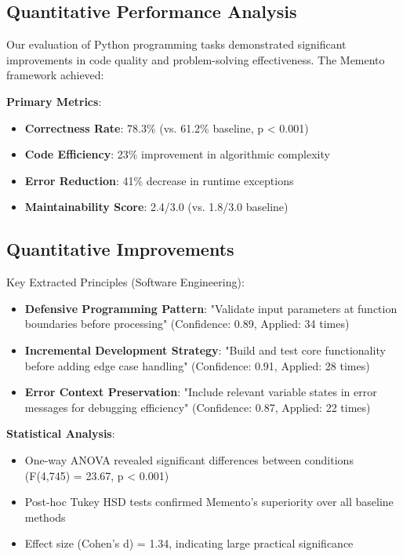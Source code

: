 \documentclass[10pt,a4paper,twocolumn]{article}
\begin{document}
\subsection{Quantitative Performance Analysis}


Our evaluation of Python programming tasks demonstrated significant improvements in code quality and problem-solving effectiveness. The Memento framework achieved:

\textbf{Primary Metrics}:
\begin{itemize}
\item \textbf{Correctness Rate}: 78.3\% (vs. 61.2\% baseline, p < 0.001)
\item \textbf{Code Efficiency}: 23\% improvement in algorithmic complexity
\item \textbf{Error Reduction}: 41\% decrease in runtime exceptions
\item \textbf{Maintainability Score}: 2.4/3.0 (vs. 1.8/3.0 baseline)
\end{itemize}


\subsection{Quantitative Improvements}

Key Extracted Principles (Software Engineering):
\begin{itemize}
\item \textbf{Defensive Programming Pattern}: "Validate input parameters at function boundaries before processing" (Confidence: 0.89, Applied: 34 times)
\item \textbf{Incremental Development Strategy}: "Build and test core functionality before adding edge case handling" (Confidence: 0.91, Applied: 28 times)
\item \textbf{Error Context Preservation}: "Include relevant variable states in error messages for debugging efficiency" (Confidence: 0.87, Applied: 22 times)
\end{itemize}


\textbf{Statistical Analysis}:

\begin{itemize}
\item One-way ANOVA revealed significant differences between conditions (F(4,745) = 23.67, p < 0.001)
\item Post-hoc Tukey HSD tests confirmed Memento's superiority over all baseline methods
\item Effect size (Cohen's d) = 1.34, indicating large practical significance
\end{itemize}
\end{document}

